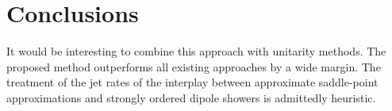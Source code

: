 \section{Conclusions}\label{sec:conclusions}

It would be interesting to combine this approach with unitarity methods.
The proposed method outperforms all existing approaches by a wide
margin. The treatment of the jet rates of the interplay between
approximate saddle-point approximations and strongly ordered dipole
showers is admittedly heuristic.

